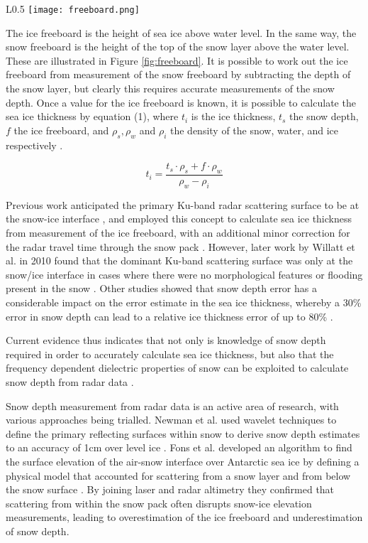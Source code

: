 \documentclass[11pt, a4paper]{article}
\begin{document}
\begin{wrapfigure}{L}{0.5\textwidth}
   		 \texttt{[image: freeboard.png]}
    		\caption{Diagram showing sea ice freeboard and thickness together with snow freeboard and depth}
	\label{fig:freeboard}
\end{wrapfigure}

The ice freeboard is the height of sea ice above water level.  In the same way,  the snow freeboard is the height of the top of the snow layer above the water level.  These are illustrated in Figure \ref{fig:freeboard}. It is possible to work out the ice freeboard from measurement of the snow freeboard by subtracting the depth of the snow layer,  but clearly this requires accurate measurements of the snow depth.  Once a value for the ice freeboard is known, it is possible to calculate the sea ice thickness by equation (1), where $t_i$ is the ice thickness, $t_s$ the snow depth, $f$ the ice freeboard, and $\rho_s, \rho_w$ and $\rho_i$ the density of the snow, water, and ice respectively \cite{SITfromSAR}.

\begin{equation}
t_i=\frac{t_s\cdot \rho_s+f\cdot\rho_w}{\rho_w-\rho_i}
\end{equation}
\linebreak

Previous work anticipated the primary Ku-band radar scattering surface to be at the snow-ice interface \cite{beaven}, and employed this concept to calculate sea ice thickness from measurement of the ice freeboard, with an additional minor correction for the radar travel time through the snow pack \cite{circthinning}.  However,  later work by Willatt et al. in 2010 found that the dominant Ku-band scattering surface was only at the snow/ice interface in cases where there were no morphological features or flooding present in the snow \cite{kubandpen}.  Other studies showed that snow depth error has a considerable impact on the error estimate in the sea ice thickness, whereby a 30\% error in snow depth can lead to a relative ice thickness error of up to 80\% \cite{kernspreen}.

Current evidence thus indicates that not only is knowledge of snow depth required in order to accurately calculate sea ice thickness, but also that the frequency dependent dielectric properties of snow can be exploited to calculate snow depth from radar data \cite{kubandpen}. 

Snow depth measurement from radar data is an active area of research, with various approaches being trialled.  Newman et al.  used wavelet techniques to define the primary reflecting surfaces within snow to derive snow depth estimates to an accuracy of 1cm over level ice \cite{newman}.  Fons et al. developed an algorithm to find the surface elevation of the air-snow interface over Antarctic sea ice by defining a physical model that accounted for scattering from a snow layer and from below the snow surface \cite{fons}. By joining laser and radar altimetry they confirmed that scattering from within the snow pack often disrupts snow-ice elevation measurements, leading to overestimation of the ice freeboard and underestimation of snow depth.  
\end{document}
